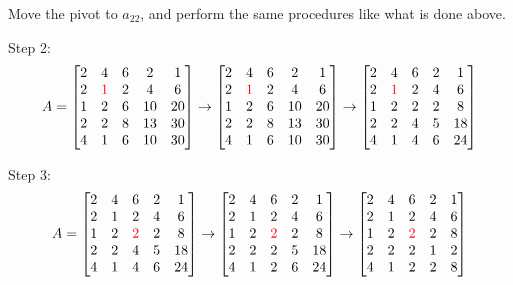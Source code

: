 \documentclass[a4paper,titlepage]{article}
\begin{document}
			Move the pivot to $a_{22}$, and perform the same procedures like what is done above. 
			
			Step 2:
			$$
				A = \begin{bmatrix}				
					2 & 4 & 6 & 2 & 1\\
					2 & \textcolor{red}{1} & 2 & 4 & 6\\
					1 & 2 & 6 & 10 & 20\\
					2 & 2 & 8 & 13 & 30\\
					4 & 1 & 6 & 10 & 30
				\end{bmatrix} \rightarrow \begin{bmatrix}				
					2 & 4 & 6 & 2 & 1\\
					2 & \textcolor{red}{1} & 2 & 4 & 6\\
					1 & 2 & 6 & 10 & 20\\
					2 & 2 & 8 & 13 & 30\\
					4 & 1 & 6 & 10 & 30
				\end{bmatrix} \rightarrow \begin{bmatrix}				
					2 & 4 & 6 & 2 & 1\\
					2 & \textcolor{red}{1} & 2 & 4 & 6\\
					1 & 2 & 2 & 2 & 8\\
					2 & 2 & 4 & 5 & 18\\
					4 & 1 & 4 & 6 & 24
				\end{bmatrix}
			$$
			
			Step 3:
			$$
			A = \begin{bmatrix}				
					2 & 4 & 6 & 2 & 1\\
					2 & 1 & 2 & 4 & 6\\
					1 & 2 & \textcolor{red}{2} & 2 & 8\\
					2 & 2 & 4 & 5 & 18\\
					4 & 1 & 4 & 6 & 24
				\end{bmatrix} \rightarrow \begin{bmatrix}				
					2 & 4 & 6 & 2 & 1\\
					2 & 1 & 2 & 4 & 6\\
					1 & 2 & \textcolor{red}{2} & 2 & 8\\
					2 & 2 & 2 & 5 & 18\\
					4 & 1 & 2 & 6 & 24
				\end{bmatrix} \rightarrow \begin{bmatrix}				
					2 & 4 & 6 & 2 & 1\\
					2 & 1 & 2 & 4 & 6\\
					1 & 2 & \textcolor{red}{2} & 2 & 8\\
					2 & 2 & 2 & 1 & 2\\
					4 & 1 & 2 & 2 & 8
				\end{bmatrix}
			$$
			
\end{document}
